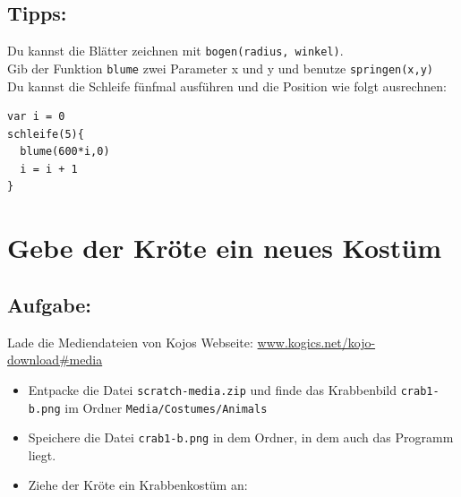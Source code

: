 \section*{\color{OliveGreen}Tipps:}
Du kannst die Blätter zeichnen mit \lstinline{bogen(radius, winkel)}. \\
Gib der Funktion \lstinline{blume} zwei Parameter x und y und benutze \lstinline{springen(x,y)}\\
Du kannst die Schleife fünfmal ausführen und die Position wie folgt ausrechnen:

\begin{lstlisting}[basicstyle={\ttfamily\fontsize{18}{22}\selectfont},numbers=none]
var i = 0          
schleife(5){
  blume(600*i,0)
  i = i + 1        
}
\end{lstlisting}
        
\chapter{Gebe der Kröte ein neues Kostüm}\section*{\color{BrickRed}Aufgabe:}
Lade die Mediendateien von Kojos Webseite:
\href{http://www.kogics.net/kojo-download#media}{www.kogics.net/kojo-download\#media}


\begin{itemize}

\item {Entpacke die Datei \lstinline{scratch-media.zip} und finde das Krabbenbild \lstinline{crab1-b.png} im Ordner \lstinline{Media/Costumes/Animals}}
\item {Speichere die Datei \lstinline{crab1-b.png} in dem Ordner, in dem auch das Programm liegt.}
\item {Ziehe der Kröte ein Krabbenkostüm an:}

\end{itemize}



  

